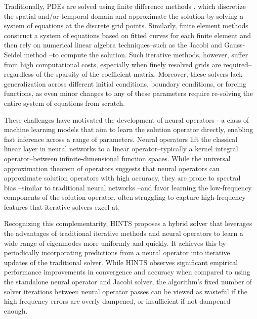 \documentclass{article} %
\begin{document}
Traditionally, PDEs are solved using finite difference methods \citep{smith1985numerical,leveque2007finite}, which discretize the spatial and/or temporal domain and approximate the solution by solving a system of equations at the discrete grid points. Similarly, finite element methods \citep{hughes2003finite,bathe2006finite,brenner2008mathematical} construct a system of equations based on fitted curves for each finite element and then rely on numerical linear algebra techniques--such as the Jacobi and Gauss-Seidel method \citep{saad2003iterative}--to compute the solution. Such iterative methods, however, suffer from high computational costs, especially when finely resolved grids are required--regardless of the sparsity of the coefficient matrix. Moreover, these solvers lack generalization across different initial conditions, boundary conditions, or forcing functions, as even minor changes to any of these parameters require re-solving the entire system of equations from scratch. 

These challenges have motivated the development of neural operators \citep{kovachki2023neural} - a class of machine learning models that aim to learn the solution operator directly, enabling fast inference across a range of parameters. Neural operators lift the classical linear layer in neural networks to a linear operator--typically a kernel integral operator--between infinite-dimensional function spaces. While the universal approximation theorem of operators \citep{chen1995universal} suggests that neural operators can approximate solution operators with high accuracy, they are prone to spectral bias \citep{liu2021multiscale,liu2024mitigating,you2024mscalefno,khodakarami2025mitigating,xu2025understanding}--similar to traditional neural networks \citep{rahaman2019spectral,xu2019frequency,luo2019theory}--and favor learning the low-frequency components of the solution operator, often struggling to capture high-frequency features that iterative solvers excel at. 

Recognizing this complementarity, HINTS \citep{zhang2024blending} proposes a hybrid solver that leverages the advantages of traditional iterative methods and neural operators  to learn a wide range of eigenmodes more uniformly and quickly. It achieves this by periodically incorporating predictions from a neural operator into iterative updates of the traditional solver. While HINTS observes significant empirical performance improvements in convergence and accuracy when compared to using the standalone neural operator and Jacobi solver, the algorithm's fixed number of solver iterations between neural operator passes can be viewed as wasteful if the high frequency errors are overly dampened, or insufficient if not dampened enough. 
\end{document}
